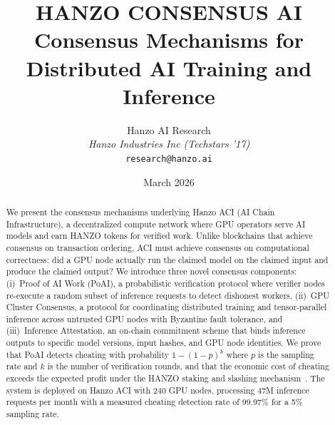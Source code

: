 \documentclass[11pt]{article}
\title{HANZO CONSENSUS AI\\[0.3em]
{\large Consensus Mechanisms for\\Distributed AI Training and Inference}}
\author{
    Hanzo AI Research \\
    \textit{Hanzo Industries Inc (Techstars '17)} \\
    \texttt{research@hanzo.ai}
}
\date{March 2026}
\begin{document}
\hanzocoverpage

\begin{abstract}
We present the consensus mechanisms underlying Hanzo ACI (AI Chain
Infrastructure), a decentralized compute network where GPU operators serve AI
models and earn HANZO tokens for verified work. Unlike blockchains that achieve
consensus on transaction ordering, ACI must achieve consensus on computational
correctness: did a GPU node actually run the claimed model on the claimed input
and produce the claimed output? We introduce three novel consensus components:
(i)~Proof of AI Work (PoAI), a probabilistic verification protocol where
verifier nodes re-execute a random subset of inference requests to detect
dishonest workers, (ii)~GPU Cluster Consensus, a protocol for coordinating
distributed training and tensor-parallel inference across untrusted GPU nodes
with Byzantine fault tolerance, and (iii)~Inference Attestation, an on-chain
commitment scheme that binds inference outputs to specific model versions, input
hashes, and GPU node identities. We prove that PoAI detects cheating with
probability $1 - (1-p)^k$ where $p$ is the sampling rate and $k$ is the number
of verification rounds, and that the economic cost of cheating exceeds the
expected profit under the HANZO staking and slashing
mechanism~\cite{hanzotokenomics}. The system is deployed on Hanzo ACI with 240
GPU nodes, processing 47M inference requests per month with a measured cheating
detection rate of 99.97\% for a 5\% sampling rate.
\end{abstract}












\end{document}
